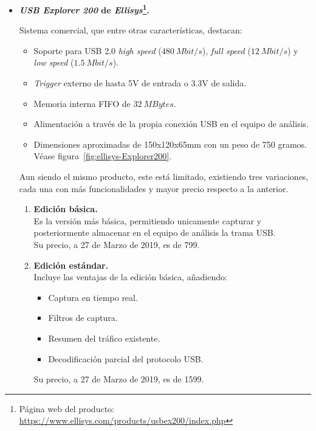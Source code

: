 \begin{itemize}
    \item \textbf{\emph{USB Explorer 200} de \emph{Ellisys}\footnote{Página web del producto: \url{https://www.ellisys.com/products/usbex200/index.php}}.}
    
    Sistema comercial, que entre otras características\cite{ellisys2008}, destacan:
    \begin{itemize}
        \item Soporte para USB 2.0 \emph{high speed} ($480~Mbit/s$), \emph{full speed} ($12~Mbit/s$) y \emph{low speed} ($1.5~Mbit/s$).
        \item \emph{Trigger} externo de hasta 5V de entrada o 3.3V de salida.
        \item Memoria interna FIFO de $32~MBytes$.
        \item Alimentación a través de la propia conexión USB en el equipo de análisis.
        \item Dimensiones aproximadas de 150x120x65mm con un peso de 750 gramos. Véase figura~\ref{fig:ellisys-Explorer200}.
    \end{itemize}

    Aun siendo el mismo producto, este está limitado, existiendo tres variaciones, cada una con más funcionalidades y mayor precio respecto a la anterior.

    \begin{enumerate}
        \item \textbf{Edición básica.} \\
        Es la versión más básica, permitiendo unicamente capturar y posteriormente almacenar en el equipo de análisis la trama USB. \\
        Su precio, a 27 de Marzo de 2019, es de 799\texteuro.
      
        \item \textbf{Edición estándar.} \\
        Incluye las ventajas de la edición básica, añadiendo:
        \begin{itemize}
            \item Captura en tiempo real.
            \item Filtros de captura.
            \item Resumen del tráfico existente.
            \item Decodificación parcial del protocolo USB.
        \end{itemize}
        Su precio, a 27 de Marzo de 2019, es de 1599\texteuro.
        

\end{enumerate}
\end{itemize}
